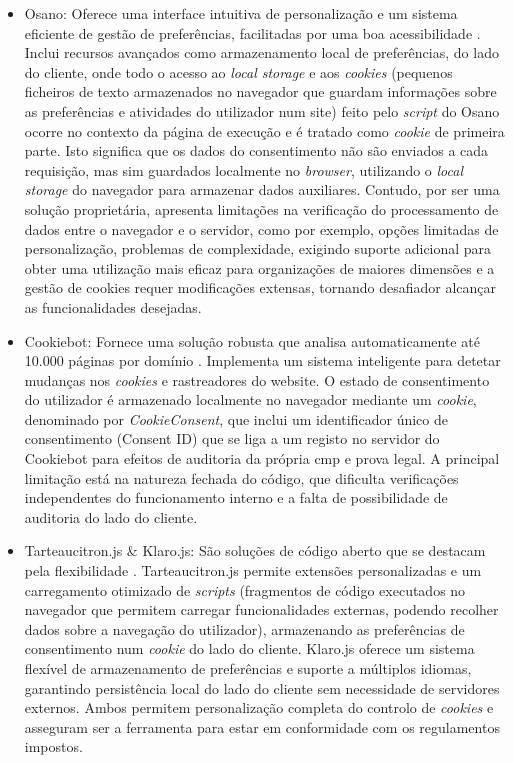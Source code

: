 \begin{itemize}
    \item Osano: Oferece uma interface intuitiva de personalização e um sistema eficiente de gestão de preferências, facilitadas por uma boa acessibilidade \cite{osano}. Inclui recursos avançados como armazenamento local de preferências, do lado do cliente, onde todo o acesso ao \textit{local storage} e aos \textit{cookies} (pequenos ficheiros de texto armazenados no navegador que guardam informações sobre as preferências e atividades do utilizador num site) feito pelo \textit{script} do Osano ocorre no contexto da página de execução e é tratado como \textit{cookie} de primeira parte. Isto significa que os dados do consentimento não são enviados a cada requisição, mas sim guardados localmente no \textit{browser}, utilizando o \textit{local storage} do navegador para armazenar dados auxiliares. Contudo, por ser uma solução proprietária, apresenta limitações na verificação do processamento de dados entre o navegador e o servidor, como por exemplo, opções limitadas de personalização, problemas de complexidade, exigindo suporte adicional para obter uma utilização mais eficaz para organizações de maiores dimensões e a gestão de cookies requer modificações extensas, tornando desafiador alcançar as funcionalidades desejadas.

    \item Cookiebot: Fornece uma solução robusta que analisa automaticamente até 10.000 páginas por domínio \cite{Cookiebot2024}. Implementa um sistema inteligente para detetar mudanças nos \textit{cookies} e rastreadores do website. O estado de consentimento do utilizador é armazenado localmente no navegador mediante um \textit{cookie}, denominado por \textit{CookieConsent}, que inclui um identificador único de consentimento (Consent ID) que se liga a um registo no servidor do Cookiebot para efeitos de auditoria da própria \acrshort{cmp} e prova legal. A principal limitação está na natureza fechada do código, que dificulta verificações independentes do funcionamento interno e a falta de possibilidade de auditoria do lado do cliente.

    \item Tarteaucitron.js \& Klaro.js: São soluções de código aberto que se destacam pela flexibilidade \cite{tarteaucitron}. Tarteaucitron.js permite extensões personalizadas e um carregamento otimizado de \textit{scripts} (fragmentos de código executados no navegador que permitem carregar funcionalidades externas, podendo recolher dados sobre a navegação do utilizador), armazenando as preferências de consentimento num \textit{cookie} do lado do cliente. Klaro.js oferece um sistema flexível de armazenamento de preferências e suporte a múltiplos idiomas, garantindo persistência local do lado do cliente sem necessidade de servidores externos. Ambos permitem personalização completa do controlo de \textit{cookies} e asseguram ser a ferramenta para estar em conformidade com os regulamentos impostos.


\end{itemize}
